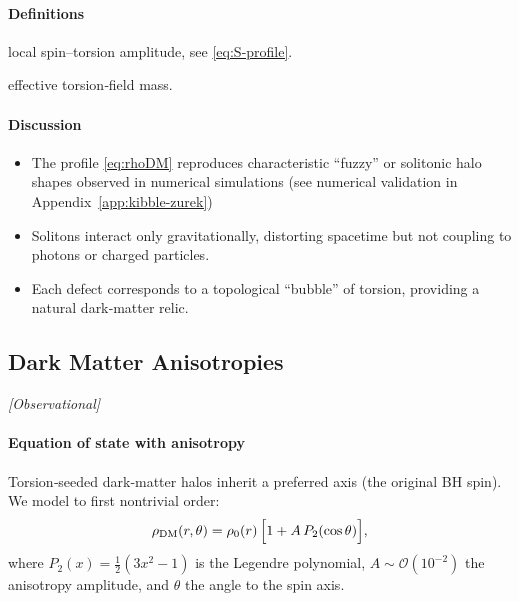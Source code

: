 \documentclass{article}
\newcommand{\obstag}{\textcolor{green!60!black}{\textit{[Observational]}}}
\begin{document}
\paragraph{Definitions}
\begin{description}[leftmargin=2em]
  \item[$S(r)$] local spin–torsion amplitude, see \eqref{eq:S-profile}.
  \item[$m_T$] effective torsion‐field mass.
\end{description}

\paragraph{Discussion}
\begin{itemize}[leftmargin=*]
  \item The profile \eqref{eq:rhoDM} reproduces characteristic “fuzzy” or solitonic halo shapes observed in numerical simulations (see numerical validation in Appendix~\ref{app:kibble-zurek})
  \item Solitons interact only gravitationally, distorting spacetime but not coupling to photons or charged particles.
  \item Each defect corresponds to a topological “bubble” of torsion, providing a natural dark‐matter relic.
\end{itemize}

\medskip
\begin{center}
\end{center}
\medskip


\subsection{Dark Matter Anisotropies}
\label{sec:DM-anisotropy}
\obstag

\paragraph{Equation of state with anisotropy}
Torsion‐seeded dark‐matter halos inherit a preferred axis (the original BH spin).  We model to first nontrivial order:
\begin{equation}
  \rho_{\rm DM}(r,\theta)
    = \rho_0(r)\,\Bigl[1 + A\,P_2(\cos\theta)\Bigr],
\end{equation}
where $P_2(x)=\tfrac12(3x^2-1)$ is the Legendre polynomial, $A\sim\mathcal O(10^{-2})$ the anisotropy amplitude, and $\theta$ the angle to the spin axis.
\end{document}
